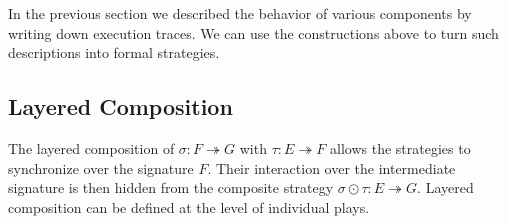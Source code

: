 \documentclass[acmsmall,screen,review,nonacm]{acmart}
\newcommand{\kw}[1]{\ensuremath{ \mathsf{#1} }}
\begin{document}

In the previous section
we described the behavior of various components
by writing down execution traces.
We can use the constructions above to turn such descriptions
into formal strategies.



\subsection{Layered Composition}
\label{sec:strategy:lcomp}

The layered
composition of
$\sigma : F \twoheadrightarrow G$ with
$\tau : E \twoheadrightarrow F$
allows the strategies to synchronize
over the signature $F$.
Their interaction over the intermediate signature is then hidden from
the composite strategy $\sigma \odot \tau : E \twoheadrightarrow G$.
Layered composition can be defined
at the level of individual plays.
\end{document}
